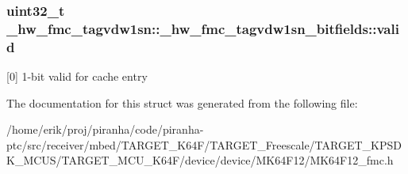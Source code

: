 \subsubsection[{\texorpdfstring{valid}{valid}}]{\setlength{\rightskip}{0pt plus 5cm}uint32\+\_\+t \+\_\+hw\+\_\+fmc\+\_\+tagvdw1sn\+::\+\_\+hw\+\_\+fmc\+\_\+tagvdw1sn\+\_\+bitfields\+::valid}\hypertarget{struct__hw__fmc__tagvdw1sn_1_1__hw__fmc__tagvdw1sn__bitfields_a0fe02b3f3857373cb2d5c56831259991}{}\label{struct__hw__fmc__tagvdw1sn_1_1__hw__fmc__tagvdw1sn__bitfields_a0fe02b3f3857373cb2d5c56831259991}
\mbox{[}0\mbox{]} 1-\/bit valid for cache entry 

The documentation for this struct was generated from the following file\+:\begin{DoxyCompactItemize}
\item 
/home/erik/proj/piranha/code/piranha-\/ptc/src/receiver/mbed/\+T\+A\+R\+G\+E\+T\+\_\+\+K64\+F/\+T\+A\+R\+G\+E\+T\+\_\+\+Freescale/\+T\+A\+R\+G\+E\+T\+\_\+\+K\+P\+S\+D\+K\+\_\+\+M\+C\+U\+S/\+T\+A\+R\+G\+E\+T\+\_\+\+M\+C\+U\+\_\+\+K64\+F/device/device/\+M\+K64\+F12/M\+K64\+F12\+\_\+fmc.\+h\end{DoxyCompactItemize}

